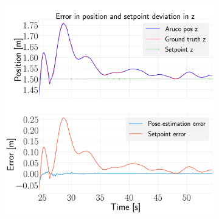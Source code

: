 \documentclass[../Head/report.tex]{subfiles}
\begin{document}
\begin{figure}[H]
\begin{subfigure}[t]{.30\textwidth}
        \caption{}
        \label{fig:hold_pose_estimation_test5_y}
    \end{subfigure}
     \hspace{0.2em}
    \begin{subfigure}[t]{.30\textwidth}
        \centering
        \includegraphics[width=\textwidth]{../Figures/hold_pose_using_aruco_pose_estimation/test5_landingBoard3_noWind/error_z/pose_error_z_test1.png}
        \caption{}
        \label{fig:hold_pose_estimation_test5_z}
    \end{subfigure}
    \caption{}
    \label{fig:hold_pose_estimation_test5_error_pos}
\end{figure}
\end{document}
